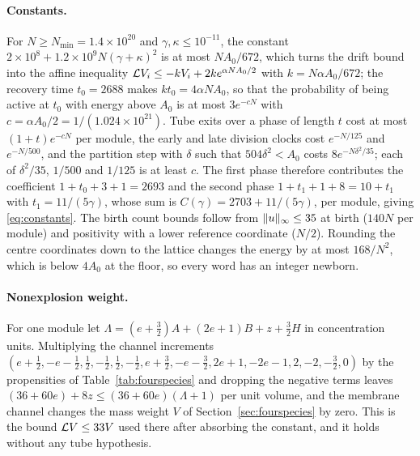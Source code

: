 \paragraph{Constants.}
For $N\ge N_{\min}=1.4\times10^{20}$ and $\gamma,\kappa\le10^{-11}$, the constant $2\times10^8+1.2\times10^9N(\gamma+\kappa)^2$ is at most $NA_0/672$, which turns the drift bound into the affine inequality $\mathcal L V_i\le-kV_i+2ke^{\alpha NA_0/2}$ with $k=N\alpha A_0/672$; the recovery time $t_0=2688$ makes $kt_0=4\alpha NA_0$, so that the probability of being active at $t_0$ with energy above $A_0$ is at most $3e^{-cN}$ with $c=\alpha A_0/2=1/(1.024\times10^{21})$. Tube exits over a phase of length $t$ cost at most $(1+t)e^{-cN}$ per module, the early and late division clocks cost $e^{-N/125}$ and $e^{-N/500}$, and the partition step with $\delta$ such that $504\delta^2<A_0$ costs $8e^{-N\delta^2/35}$; each of $\delta^2/35$, $1/500$ and $1/125$ is at least $c$. The first phase therefore contributes the coefficient $1+t_0+3+1=2693$ and the second phase $1+t_1+1+8=10+t_1$ with $t_1=11/(5\gamma)$, whose sum is $C(\gamma)=2703+11/(5\gamma)$, per module, giving \eqref{eq:constants}. The birth count bounds follow from $\lVert u\rVert_\infty\le35$ at birth ($140N$ per module) and positivity with a lower reference coordinate ($N/2$). Rounding the centre coordinates down to the lattice changes the energy by at most $168/N^2$, which is below $4A_0$ at the floor, so every word has an integer newborn.

\paragraph{Nonexplosion weight.}
For one module let $\Lambda=(e+\tfrac32)A+(2e+1)B+z+\tfrac32H$ in concentration units. Multiplying the channel increments $(e+\tfrac12,-e-\tfrac12,\tfrac12,-\tfrac12,\tfrac12,-\tfrac12,e+\tfrac32,-e-\tfrac32,2e+1,-2e-1,2,-2,-\tfrac32,0)$ by the propensities of Table~\ref{tab:fourspecies} and dropping the negative terms leaves $(36+60e)+8z\le(36+60e)(\Lambda+1)$ per unit volume, and the membrane channel changes the mass weight $V$ of Section~\ref{sec:fourspecies} by zero. This is the bound $\mathcal L V\le33V$ used there after absorbing the constant, and it holds without any tube hypothesis.

